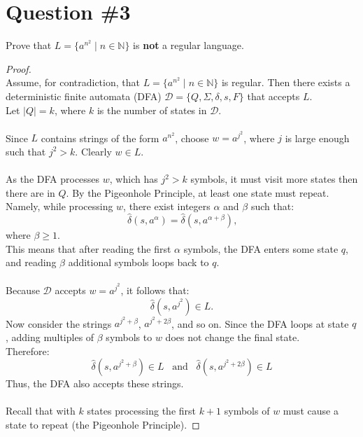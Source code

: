 \documentclass[12pt]{article}
\begin{document}
\section*{Question \#3}
Prove that \( L = \{ a^{n^2} \mid n \in \mathbb{N} \} \) is \textbf{not} a regular language.
\begin{proof}
\leavevmode\\
    Assume, for contradiction, that \( L = \{ a^{n^2} \mid n \in \mathbb{N} \} \) is regular. Then there exists a deterministic finite automata (DFA) \( \mathcal{D} = \{ Q, \Sigma, \delta, s, F \} \) that accepts \( L \). \\
    Let \( |Q| = k \), where \( k \) is the number of states in \( \mathcal{D} \). \\
    \\
    Since \( L \) contains strings of the form \( a^{n^2} \), choose \( w = a^{j^2} \), where \( j \) is large enough such that \( j^2 > k \). Clearly \( w \in L \). \\
    \\
    As the DFA processes \( w \), which has \( j^2 > k \) symbols, it must visit more states then there are in \( Q \). By the Pigeonhole Principle, at least one state must repeat. \\
    Namely, while processing \( w \), there exist integers \( \alpha \) and \( \beta \) such that:
    \[ \hat{\delta}(s, a^{\alpha}) = \hat{\delta}(s, a^{\alpha + \beta}) \text{,} \]
    where \( \beta \geq 1 \). \\
    This means that after reading the first \( \alpha \) symbols, the DFA enters some state \( q \), and reading \( \beta \) additional symbols loops back to \( q \). \\
    \\
    Because \( \mathcal{D} \) accepts \( w = a^{j^2} \), it follows that:
    \[
        \hat{\delta}(s, a^{j^2}) \in L \text{.}
    \]
    Now consider the strings \( a^{j^2 + \beta} \), \( a^{j^2 + 2\beta} \), and so on. Since the DFA loops at state \( q \), adding multiples of \( \beta \) symbols to \( w \) does not change the final state. \\
    Therefore:
    \[
        \hat{\delta}(s, a^{j^2 + \beta}) \in L \;\;\; \text{and} \;\;\; \hat{\delta}(s, a^{j^2 + 2\beta}) \in L
    \]
    Thus, the DFA also accepts these strings. \\
    \\
    Recall that with \( k \) states processing the first \( k + 1 \) symbols of \( w \) must cause a state to repeat (the Pigeonhole Principle).

\end{proof}
\end{document}

